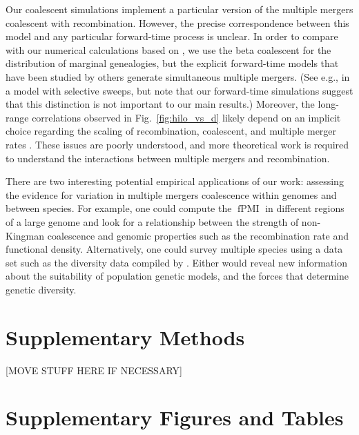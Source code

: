 \documentclass[11pt, letterpaper]{article}   	%
\newcommand{\fig}[1]{Fig.~\ref{#1}}
\DeclareMathOperator{\fpmi}{fPMI}
\begin{document}
Our coalescent simulations implement a particular version of the multiple mergers coalescent with recombination.
However, the precise correspondence between this model and any particular forward-time process is unclear.
In order to compare with our numerical calculations based on \cite{BirknerEtAl2013}, we use the beta coalescent for the distribution of marginal genealogies, but the explicit forward-time models that have been studied by others generate simultaneous multiple mergers.
(See e.g., \cite{DurrettSchweinsberg2005} in a model with selective sweeps, but note that our forward-time simulations suggest that this distinction is not important to our main results.)
Moreover, the long-range correlations observed in \fig{fig:hilo_vs_d} likely depend on an implicit choice regarding the scaling of recombination, coalescent, and multiple merger rates \autocite{EldonWakeley2006}.
These issues are poorly understood, and more theoretical work is required to understand the interactions between multiple mergers and recombination.

There are two interesting potential empirical applications of our work: assessing the evidence for variation in multiple mergers coalescence within genomes and between species.
For example, one could compute the $\fpmi$ in different regions of a large genome and look for a relationship between the strength of non-Kingman coalescence and genomic properties such as the recombination rate and functional density.
Alternatively, one could survey multiple species using a data set such as the diversity data compiled by \cite{Corbett-DetigEtAl2015}.
Either would reveal new information about the suitability of population genetic models, and the forces that determine genetic diversity.

\printbibliography

\section*{Supplementary Methods}
[MOVE STUFF HERE IF NECESSARY]

\clearpage

\section*{Supplementary Figures and Tables}
\end{document}
